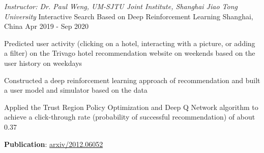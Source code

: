 \begin{cventries}




\cventry
    {\it Instructor: Dr. Paul Weng, UM-SJTU Joint Institute, Shanghai Jiao Tong University} %
    {Interactive Search Based on Deep Reinforcement Learning} %
    {Shanghai, China} %
    {Apr 2019 - Sep 2020} %
    {
      \begin{cvitems} %
        \item {Predicted user activity (clicking on a hotel, interacting with a picture, or adding a filter) on the Trivago hotel recommendation website on weekends based on the user history on weekdays}
        \item {Constructed a deep reinforcement learning approach of recommendation and built a user model and simulator based on the data}
        \item {Applied the Trust Region Policy Optimization and Deep Q Network algorithm to achieve a click-through rate (probability of successful recommendation) of about 0.37}
        \item {\textbf{Publication}: \href{https://arxiv.org/abs/2012.06052}{arxiv/2012.06052}}
      \end{cvitems}
    }



\end{cventries}
